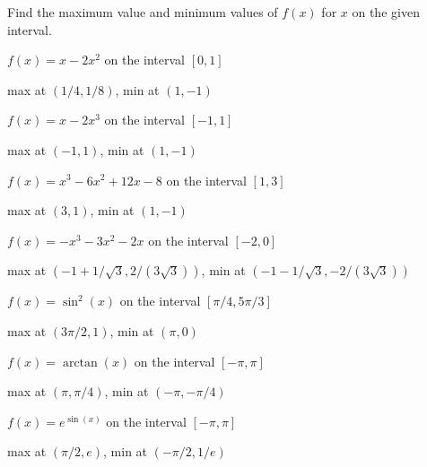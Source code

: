 \begin{exercises}
\noindent Find the maximum value and minimum values of $f(x)$ for $x$
on the given interval.

\begin{exercise}
$f(x) = x-2x^2$ on the interval $[0,1]$
\begin{answer}
max at $(1/4,1/8)$, min at $(1,-1)$
\end{answer}
\end{exercise}

\begin{exercise}
$f(x) = x-2x^3$ on the interval $[-1,1]$
\begin{answer}
max at $(-1,1)$, min at $(1,-1)$
\end{answer}
\end{exercise}

\begin{exercise}
$f(x) = x^3-6x^2+12x-8$ on the interval $[1,3]$
\begin{answer}
max at $(3,1)$, min at $(1,-1)$
\end{answer}
\end{exercise}

\begin{exercise}
$f(x) = -x^3-3x^2-2x$ on the interval $[-2,0]$
\begin{answer}
max at $(-1+1/\sqrt{3},2/(3\sqrt{3}))$, min at
$(-1-1/\sqrt{3},-2/(3\sqrt{3}))$
\end{answer}
\end{exercise}

\begin{exercise}
$f(x) = \sin^2(x)$ on the interval $[\pi/4,5\pi/3]$
\begin{answer}
max at $(3\pi/2,1)$, min at
$(\pi,0)$
\end{answer}
\end{exercise}

\begin{exercise}
$f(x) = \arctan(x)$ on the interval $[-\pi,\pi]$
\begin{answer}
max at $(\pi,\pi/4)$, min at
$(-\pi,-\pi/4)$
\end{answer}
\end{exercise}

\begin{exercise}
$f(x) = e^{\sin(x)}$ on the interval $[-\pi,\pi]$
\begin{answer}
max at $(\pi/2,e)$, min at
$(-\pi/2,1/e)$
\end{answer}
\end{exercise}


\end{exercises}
